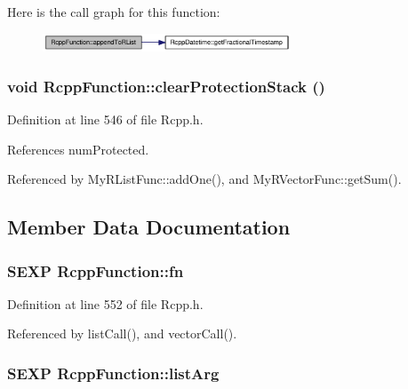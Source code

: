 Here is the call graph for this function:\nopagebreak
\begin{figure}[H]
\begin{center}
\leavevmode
\includegraphics[width=209pt]{classRcppFunction_0be4ab064287c2d3a5c3b883a1707d70_cgraph}
\end{center}
\end{figure}
\hypertarget{classRcppFunction_689c914636f0f0e86b90da4425c6e6a3}{
\subsubsection[clearProtectionStack]{\setlength{\rightskip}{0pt plus 5cm}void RcppFunction::clearProtectionStack ()}}
\label{classRcppFunction_689c914636f0f0e86b90da4425c6e6a3}




Definition at line 546 of file Rcpp.h.

References numProtected.

Referenced by MyRListFunc::addOne(), and MyRVectorFunc::getSum().

\subsection{Member Data Documentation}
\hypertarget{classRcppFunction_a6b5966224b8b7d158be6cdfc3612063}{
\subsubsection[fn]{\setlength{\rightskip}{0pt plus 5cm}SEXP {\bf RcppFunction::fn}}}
\label{classRcppFunction_a6b5966224b8b7d158be6cdfc3612063}




Definition at line 552 of file Rcpp.h.

Referenced by listCall(), and vectorCall().\hypertarget{classRcppFunction_3b8a2c8441c9791f9fe5bd5273bbceec}{
\subsubsection[listArg]{\setlength{\rightskip}{0pt plus 5cm}SEXP {\bf RcppFunction::listArg}}}
\label{classRcppFunction_3b8a2c8441c9791f9fe5bd5273bbceec}




